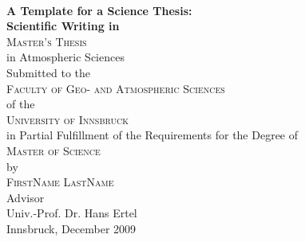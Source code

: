 \begin{titlepage}
\begin{center}

~\\[15mm]
{\Huge  {\bf A Template for a Science Thesis:}}\\[5mm]


{\LARGE {\bf Scientific Writing in \LaTeXe{}}}\\[15mm]


{\Large \textsc{Master's Thesis}} \\[15mm]


{\large in Atmospheric Sciences} \\[15mm]


{\large Submitted to the} \\[2mm]
{\Large \textsc{Faculty of Geo- and Atmospheric Sciences}} \\[2mm]
{\large of the} \\[2mm]
{\Large \textsc{University of Innsbruck}} \\[15mm]


{\large in Partial Fulfillment of the Requirements for the Degree of} \\[2mm]
{\Large \textsc{Master of Science}} \\[15mm]


{\large by} \\[2mm]
{\Large \textsc{FirstName LastName}} \\[15mm]


{\large Advisor} \\[2mm]
{\large Univ.-Prof. Dr. Hans Ertel} \\[15mm]


{\large Innsbruck, December 2009}


\end{center}
\end{titlepage}
